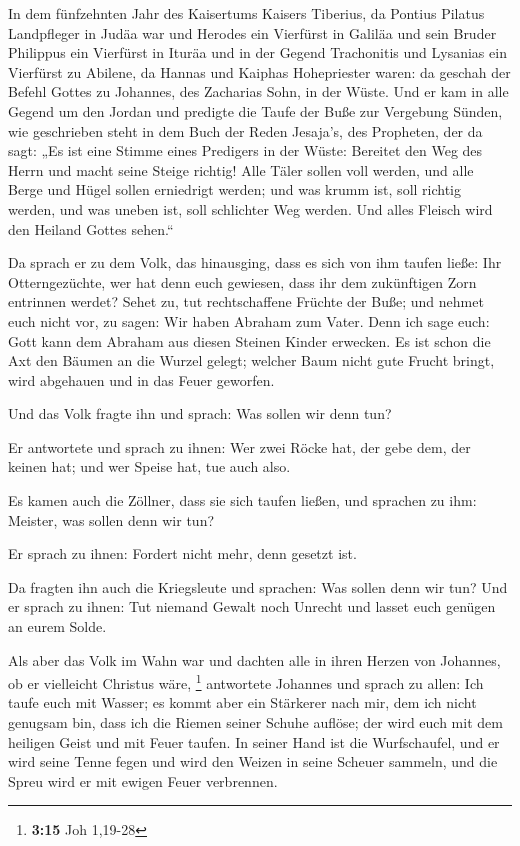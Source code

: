  In dem fünfzehnten Jahr des Kaisertums Kaisers Tiberius,
da Pontius Pilatus Landpfleger in Judäa war und Herodes ein Vierfürst in
Galiläa und sein Bruder Philippus ein Vierfürst in Ituräa und in der
Gegend Trachonitis und Lysanias ein Vierfürst zu Abilene, 
da Hannas und Kaiphas Hohepriester waren: da geschah der Befehl Gottes
zu Johannes, des Zacharias Sohn, in der Wüste.  Und er kam
in alle Gegend um den Jordan und predigte die Taufe der Buße zur
Vergebung Sünden,  wie geschrieben steht in dem Buch der
Reden Jesaja's, des Propheten, der da sagt: „Es ist eine Stimme eines
Predigers in der Wüste: Bereitet den Weg des Herrn und macht seine
Steige richtig!  Alle Täler sollen voll werden, und alle
Berge und Hügel sollen erniedrigt werden; und was krumm ist, soll
richtig werden, und was uneben ist, soll schlichter Weg werden.
 Und alles Fleisch wird den Heiland Gottes sehen.``

 Da sprach er zu dem Volk, das hinausging, dass es sich
von ihm taufen ließe: Ihr Otterngezüchte, wer hat denn euch gewiesen,
dass ihr dem zukünftigen Zorn entrinnen werdet?  Sehet zu,
tut rechtschaffene Früchte der Buße; und nehmet euch nicht vor, zu
sagen: Wir haben Abraham zum Vater. Denn ich sage euch: Gott kann dem
Abraham aus diesen Steinen Kinder erwecken.  Es ist schon
die Axt den Bäumen an die Wurzel gelegt; welcher Baum nicht gute Frucht
bringt, wird abgehauen und in das Feuer geworfen.

 Und das Volk fragte ihn und sprach: Was sollen wir denn
tun?

 Er antwortete und sprach zu ihnen: Wer zwei Röcke hat,
der gebe dem, der keinen hat; und wer Speise hat, tue auch also.

 Es kamen auch die Zöllner, dass sie sich taufen ließen,
und sprachen zu ihm: Meister, was sollen denn wir tun?

 Er sprach zu ihnen: Fordert nicht mehr, denn gesetzt
ist.

 Da fragten ihn auch die Kriegsleute und sprachen: Was
sollen denn wir tun? Und er sprach zu ihnen: Tut niemand Gewalt noch
Unrecht und lasset euch genügen an eurem Solde.

 Als aber das Volk im Wahn war und dachten alle in ihren
Herzen von Johannes, ob er vielleicht Christus wäre, \footnote{\textbf{3:15}
  Joh 1,19-28}  antwortete Johannes und sprach zu allen:
Ich taufe euch mit Wasser; es kommt aber ein Stärkerer nach mir, dem ich
nicht genugsam bin, dass ich die Riemen seiner Schuhe auflöse; der wird
euch mit dem heiligen Geist und mit Feuer taufen.  In
seiner Hand ist die Wurfschaufel, und er wird seine Tenne fegen und wird
den Weizen in seine Scheuer sammeln, und die Spreu wird er mit ewigen
Feuer verbrennen.

